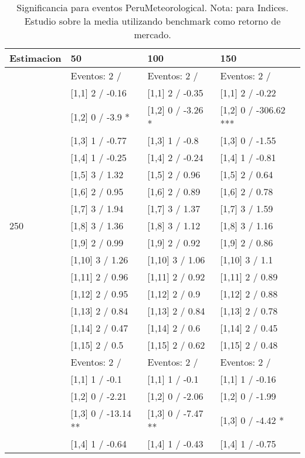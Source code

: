 \begin{table}

\caption{Significancia para eventos PeruMeteorological. Nota: para Indices. Estudio sobre la media utilizando benchmark como retorno de mercado.}
\centering
\begin{tabular}[t]{llll}
\toprule
Estimacion & 50 & 100 & 150\\
\midrule
 & Eventos:  2 / & Eventos:  2 / & Eventos:  2 /\\
 & {}[1,1] 2  / -0.16 & {}[1,1] 2  / -0.35 & {}[1,1] 2  / -0.22\\
 & {}[1,2] 0  / -3.9 * & {}[1,2] 0  / -3.26 * & {}[1,2] 0  / -306.62 ***\\
 & {}[1,3] 1  / -0.77 & {}[1,3] 1  / -0.8 & {}[1,3] 0  / -1.55\\
 & {}[1,4] 1  / -0.25 & {}[1,4] 2  / -0.24 & {}[1,4] 1  / -0.81\\
\addlinespace
 & {}[1,5] 3  / 1.32 & {}[1,5] 2  / 0.96 & {}[1,5] 2  / 0.64\\
 & {}[1,6] 2  / 0.95 & {}[1,6] 2  / 0.89 & {}[1,6] 2  / 0.78\\
 & {}[1,7] 3  / 1.94 & {}[1,7] 3  / 1.37 & {}[1,7] 3  / 1.59\\
250 & {}[1,8] 3  / 1.36 & {}[1,8] 3  / 1.12 & {}[1,8] 3  / 1.16\\
 & {}[1,9] 2  / 0.99 & {}[1,9] 2  / 0.92 & {}[1,9] 2  / 0.86\\
\addlinespace
 & {}[1,10] 3  / 1.26 & {}[1,10] 3  / 1.06 & {}[1,10] 3  / 1.1\\
 & {}[1,11] 2  / 0.96 & {}[1,11] 2  / 0.92 & {}[1,11] 2  / 0.89\\
 & {}[1,12] 2  / 0.95 & {}[1,12] 2  / 0.9 & {}[1,12] 2  / 0.88\\
 & {}[1,13] 2  / 0.84 & {}[1,13] 2  / 0.84 & {}[1,13] 2  / 0.78\\
 & {}[1,14] 2  / 0.47 & {}[1,14] 2  / 0.6 & {}[1,14] 2  / 0.45\\
\addlinespace
 & {}[1,15] 2  / 0.5 & {}[1,15] 2  / 0.62 & {}[1,15] 2  / 0.48\\
 & Eventos:  2 / & Eventos:  2 / & Eventos:  2 /\\
 & {}[1,1] 1  / -0.1 & {}[1,1] 1  / -0.1 & {}[1,1] 1  / -0.16\\
 & {}[1,2] 0  / -2.21 & {}[1,2] 0  / -2.06 & {}[1,2] 0  / -1.99\\
 & {}[1,3] 0  / -13.14 ** & {}[1,3] 0  / -7.47 ** & {}[1,3] 0  / -4.42 *\\
\addlinespace
 & {}[1,4] 1  / -0.64 & {}[1,4] 1  / -0.43 & {}[1,4] 1  / -0.75\\

\end{tabular}
\end{table}
